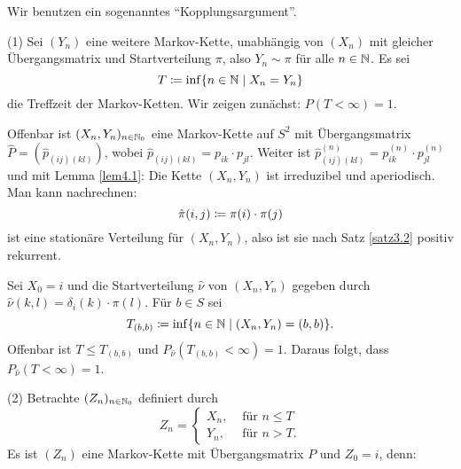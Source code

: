\documentclass[a4paper,twoside,DIV15,BCOR12mm]{scrbook}
\begin{document}
\begin{beweis}
Wir benutzen ein sogenanntes ``Kopplungsargument''.

(1) Sei $(Y_n)$ eine weitere Markov-Kette, unabhängig von $(X_n)$ mit gleicher Übergangsmatrix und Startverteilung $\pi$, also $Y_n\sim \pi$ für alle $n\in \mathbb{N}$. Es sei
\[
T\da \inf\{n\in \MdN \mid X_n = Y_n\}
\]
die Treffzeit der Markov-Ketten. Wir zeigen zunächst: $P(T<\infty) = 1$.

Offenbar ist $(X_n,Y_n)_{n\in\mathbb{N}_0}$ eine Markov-Kette auf $S^2$ mit Übergangsmatrix $\hat P=(\hat p_{(ij)(kl)})$, wobei $\hat p_{(ij)(kl)} = p_{ik}\cdot p_{jl}$. Weiter ist $\hat p_{(ij)(kl)}^{(n)} = p_{ik}^{(n)} \cdot p_{jl}^{(n)}$ und mit Lemma \ref{lem4.1}: Die Kette $(X_n,Y_n)$ ist irreduzibel und aperiodisch. Man kann nachrechnen:
\[
\hat \pi (i,j) \da \pi(i)\cdot\pi(j)
\]
ist eine stationäre Verteilung für $(X_n,Y_n)$, also ist sie nach Satz \ref{satz3.2} positiv rekurrent.

Sei $X_0=i$ und die Startverteilung $\hat \nu$ von $(X_n,Y_n)$ gegeben durch $\hat \nu (k,l) = \delta_i(k) \cdot\pi(l)$. Für $b\in S$ sei 
\[
T_{(b,b)} \da \inf\{n\in\MdN \mid (X_n,Y_n) = (b,b) \}.
\]
Offenbar ist $T\le T_{(b,b)}$ und $P_{\hat \nu}(T_{(b,b)}<\infty)=1$. Daraus folgt, dass $P_{\hat \nu}(T<\infty)=1$.


(2) Betrachte $(Z_n)_{n\in\mathbb{N}_0}$ definiert durch
\[
Z_n= 
\begin{cases}
X_n, &\text{ für } n\le T \\
Y_n, &\text{ für } n>T.
\end{cases}
\]
Es ist $(Z_n)$ eine Markov-Kette mit Übergangsmatrix $P$ und $Z_0=i$, denn:


\end{beweis}
\end{document}
